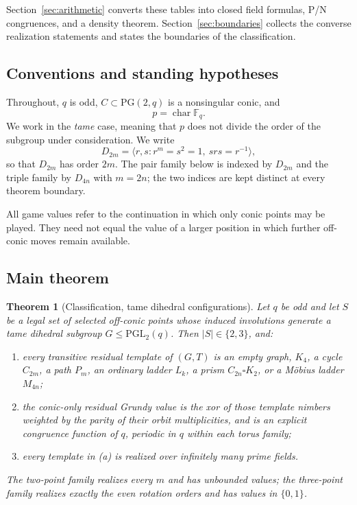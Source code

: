 \documentclass[11pt]{article}
\newtheorem{theorem}{Theorem}[section]
\theoremstyle{definition}
\theoremstyle{remark}
\newcommand{\PG}{\mathrm{PG}}
\newcommand{\PGL}{\mathrm{PGL}}
\newcommand{\F}{\mathbb{F}}
\newcommand{\Cyc}{C}
\newcommand{\Mob}{M}
\begin{document}
Section~\ref{sec:arithmetic} converts these tables into closed field formulas, P/N congruences, and
a density theorem. Section~\ref{sec:boundaries} collects the converse realization statements and
states the boundaries of the classification.

\subsection{Conventions and standing hypotheses}

Throughout, $q$ is odd, $C\subset\PG(2,q)$ is a nonsingular conic, and
\[
  p=\operatorname{char}\F_q .
\]
We work in the \emph{tame} case, meaning that $p$ does not divide the order of the subgroup under
consideration. We write
\[
  D_{2m}=\langle r,s : r^m=s^2=1,\ srs=r^{-1}\rangle,
\]
so that $D_{2m}$ has order $2m$. The pair family below is indexed by $D_{2m}$ and the triple family
by $D_{4n}$ with $m=2n$; the two indices are kept distinct at every theorem boundary.

All game values refer to the continuation in which only conic points may be played. They need not
equal the value of a larger position in which further off-conic moves remain available.

\subsection{Main theorem}

\begin{theorem}[Classification, tame dihedral configurations]
\label{thm:main}
Let $q$ be odd and let $S$ be a legal set of selected off-conic points whose induced involutions
generate a tame dihedral subgroup $G\le\PGL_2(q)$. Then $|S|\in\{2,3\}$, and:
\begin{enumerate}[label=(\alph*)]
  \item every transitive residual template of $(G,T)$ is an empty graph, $K_4$, a cycle $\Cyc_{2m}$,
    a path $P_m$, an ordinary ladder $L_k$, a prism $\Cyc_{2n}\square K_2$, or a Möbius ladder
    $\Mob_{4n}$;
  \item the conic-only residual Grundy value is the xor of those template nimbers weighted by the
    parity of their orbit multiplicities, and is an explicit congruence function of $q$, periodic
    in $q$ within each torus family;
  \item every template in (a) is realized over infinitely many prime fields.
\end{enumerate}
The two-point family realizes every $m$ and has unbounded values; the three-point family realizes
exactly the even rotation orders and has values in $\{0,1\}$.
\end{theorem}
\end{document}
